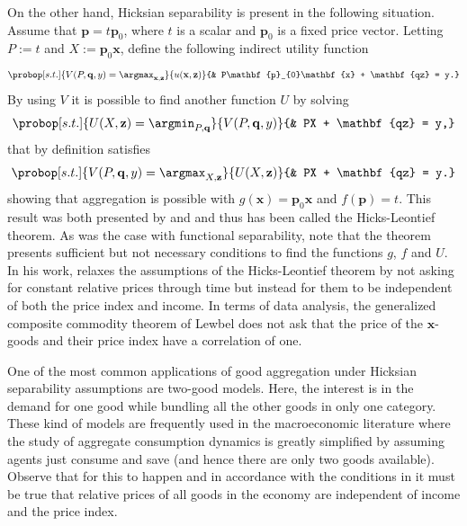 \documentclass[english, a4paper, 12pt]{article}
\begin{document}
On the other hand, Hicksian separability is present in the following situation. Assume that $\mathbf{p} = t\mathbf{p}_{0}$, where $t$ is a scalar and $\mathbf{p}_{0}$ is a fixed price vector. Letting $P := t$ and $X := \mathbf{p}_{0}\mathbf{x}$, define the following indirect utility function
	$$	\probop[s.t.]{V(P, \mathbf{q}, y) = \argmax_{\mathbf{x}, \mathbf{z}}}{u(\mathbf{x}, \mathbf{z})}
				{&	P\mathbf{p}_{0}\mathbf{x} + \mathbf{qz} = y.}
	$$
By using $V$ it is possible to find another function $U$ by solving
	$$	\probop[s.t.]{U(X, \mathbf{z}) = \argmin_{P, \mathbf{q}}}{V(P, \mathbf{q},y)}
				{&	PX + \mathbf{qz} = y,}
	$$
that by definition satisfies
	$$	\probop[s.t.]{V(P, \mathbf{q}, y) = \argmax_{X, \mathbf{z}}}{U(X, \mathbf{z})}
				{&	PX + \mathbf{qz} = y.}
	$$
showing that aggregation is possible with $g(\mathbf{x}) = \mathbf{p}_{0}\mathbf{x}$ and $f(\mathbf{p}) = t$. This result was both presented by \cite{Leontief36} and \cite{HicksBook} and thus has been called the Hicks-Leontief theorem. As was the case with functional separability, note that the theorem presents sufficient but not necessary conditions to find the functions $g$, $f$ and $U$. In his work, \cite{Lewbel96} relaxes the assumptions of the Hicks-Leontief theorem by not asking for constant relative prices through time but instead for them to be independent of both the price index and income. In terms of data analysis, the generalized composite commodity theorem of Lewbel does not ask that the price of the $\mathbf{x}$-goods and their price index have a correlation of one.

One of the most common applications of good aggregation under Hicksian separability assumptions are two-good models. Here, the interest is in the demand for one good while bundling all the other goods in only one category. These kind of models are frequently used in the macroeconomic literature where the study of aggregate consumption dynamics is greatly simplified by assuming agents just consume and save (and hence there are only two goods available). Observe that for this to happen and in accordance with the conditions in \cite{Lewbel96} it must be true that relative prices of all goods in the economy are independent of income and the price index. 
\end{document}
